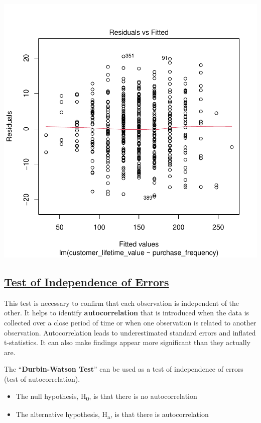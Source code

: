 \documentclass[
]{article}
\begin{document}
\includegraphics{1_simple_linear_regression_files/figure-latex/test_of_linearity-1.pdf}

\subsection{\texorpdfstring{\ul{\textbf{Test of Independence of
Errors}}}{Test of Independence of Errors}}\label{test-of-independence-of-errors}

This test is necessary to confirm that each observation is independent
of the other. It helps to identify \textbf{autocorrelation} that is
introduced when the data is collected over a close period of time or
when one observation is related to another observation. Autocorrelation
leads to underestimated standard errors and inflated t-statistics. It
can also make findings appear more significant than they actually are.

The ``\textbf{Durbin-Watson Test}'' can be used as a test of
independence of errors (test of autocorrelation).

\begin{itemize}
\item
  The null hypothesis, H\textsubscript{0}, is that there is no
  autocorrelation
\item
  The alternative hypothesis, H\textsubscript{a}, is that there is
  autocorrelation
\end{itemize}
\end{document}
